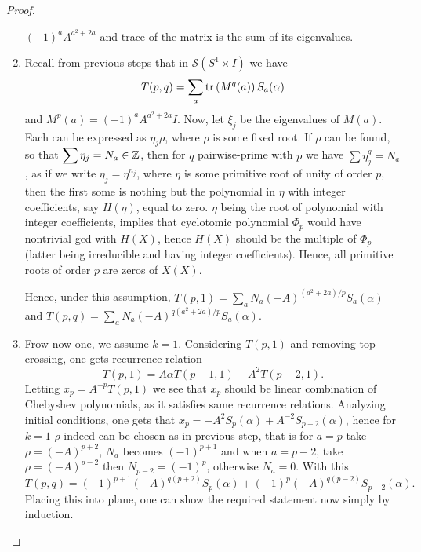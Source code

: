 \documentclass[10pt]{article} %
\theoremstyle{remark}
\renewcommand{\S}{\mathcal{S}}
\begin{document}
\begin{proof}
\begin{enumerate}[1$^\circ$]
	$(-1)^aA^{a^2+2a}$ and trace of the matrix is the sum of its eigenvalues.
\item Recall from previous steps that in $\S(S^1\times I)$ we have
	\[T(p,q)=\sum_a\mbox{tr}\mybra{M^q(a)}S_a(\alpha)\]
	and $M^p(a)=(-1)^aA^{a^2+2a}I$. Now, let $\xi_j$ be the eigenvalues of $M(a)$. Each can be expressed as $\eta_j\rho$, where
	$\rho$ is some fixed root. If $\rho$ can be found, so that $\sum\eta_j=N_a\in\Z$, then for $q$ pairwise-prime with $p$
	we have $\sum\eta^q_j=N_a$, as if we write $\eta_j=\eta^{n_j}$, where $\eta$ is some primitive root of unity of order $p$, then
	the first some is nothing but the polynomial in $\eta$ with integer coefficients, say $H(\eta)$,
	equal to zero. $\eta$ being the root of polynomial
	with integer coefficients, implies that cyclotomic polynomial $\Phi_p$ would have nontrivial gcd with $H(X)$, hence $H(X)$ should be the
	multiple of $\Phi_p$ (latter being irreducible and having integer coefficients). Hence, all primitive roots of order $p$ are zeros of
	$X(X)$.

	Hence, under this assumption, $T(p,1)=\sum_aN_a(-A)^{(a^2+2a)/p}S_a(\alpha)$ and $T(p,q)=\sum_aN_a(-A)^{q(a^2+2a)/p}S_a(\alpha)$.
\item Frow now one, we assume $k=1$. Considering $T(p,1)$ and removing top crossing, one gets recurrence relation
	\[T(p,1)=A\alpha T(p-1,1)-A^2T(p-2,1).\]
	Letting $x_p=A^{-p}T(p,1)$ we see that $x_p$ should be linear combination of Chebyshev polynomials, as it satisfies
	same recurrence relations. Analyzing initial conditions, one gets that $x_p=-A^2S_p(\alpha)+A^{-2}S_{p-2}(\alpha)$, hence 
	for $k=1$ $\rho$ indeed can be chosen as in previous step, that is for $a=p$ take $\rho=(-A)^{p+2}$, $N_a$ becomes
	$(-1)^{p+1}$ and when $a=p-2$, take $\rho=(-A)^{p-2}$ then $N_{p-2}=(-1)^p$, otherwise $N_a=0$.
	With this
	\[T(p,q)=(-1)^{p+1}(-A)^{q(p+2)}S_p(\alpha)+(-1)^p(-A)^{q(p-2)}S_{p-2}(\alpha).\]
	Placing this into plane, one can show the required statement now simply by induction.
\end{enumerate}
\end{proof}
\end{document}
